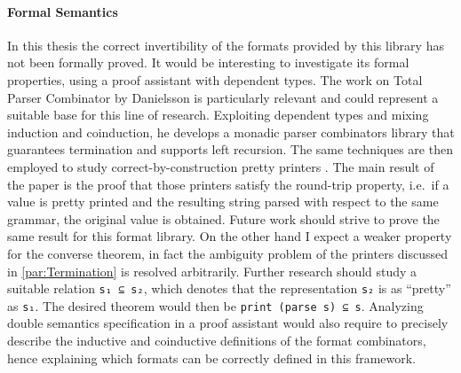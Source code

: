 \documentclass[../Thesis.tex]{subfiles}
\begin{document}
\paragraph{Formal Semantics}
In this thesis the correct invertibility of the formats provided by this
library has not been formally proved.
It would be interesting to investigate its formal properties, using
a proof assistant with dependent types.
The work on Total Parser Combinator by Danielsson 
\cite{TotalParserCombinator} is particularly relevant and could
represent a suitable base for this line of research.
Exploiting dependent types and mixing induction and coinduction, 
he develops a monadic parser combinators library that guarantees 
termination and supports left recursion.
The same techniques are then employed to study correct-by-construction
pretty printers \cite{CorrectByConstruction}. The main result of the paper
is the proof that those printers satisfy the round-trip property,
i.e.\ if a value is pretty printed and the resulting string parsed with respect
to the same grammar, the original value is obtained.
Future work should strive to prove the same result for this format library.
On the other hand I expect a weaker property for the converse theorem, in fact 
the ambiguity problem of the printers discussed in \ref{par:Termination}
is resolved arbitrarily. Further research should study a suitable relation
\texttt{s₁ ⊆ s₂}, which denotes that the representation \texttt{s₂}
is as ``pretty'' as \texttt{s₁}.
The desired theorem would then be \texttt{print (parse s) ⊆ s}.
Analyzing double semantics specification in a proof assistant would
also require to precisely describe the inductive and coinductive definitions
of the format combinators, hence explaining which formats can be 
correctly defined in this framework.

	
 	
\end{document}
